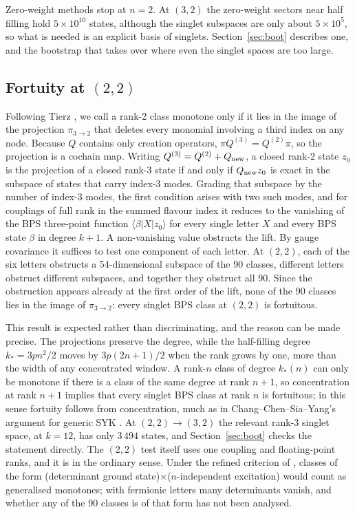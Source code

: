 \documentclass[10pt]{article}
\begin{document}
Zero-weight methods stop at $n=2$. At $(3,2)$ the zero-weight sectors near half filling hold $5\times10^{10}$
states, although the singlet subspaces are only about $5\times10^5$, so what is needed is an explicit basis of
singlets. Section~\ref{sec:boot} describes one, and the bootstrap that takes over where even the singlet spaces are
too large.

\subsection{\texorpdfstring{Fortuity at $(2,2)$}{Fortuity at (2,2)}}\label{sec:fortuity}

Following Tierz \cite{Tierz}, we call a rank-2 class monotone only if it lies in the image of the projection
$\pi_{3\to2}$ that deletes every monomial involving a third index on any node. Because $Q$ contains only creation
operators, $\pi Q^{(3)}=Q^{(2)}\pi$, so the projection is a cochain map. Writing $Q^{(3)}=Q^{(2)}+Q_{\rm new}$, a
closed rank-2 state $z_0$ is the projection of a closed rank-3 state if and only if $Q_{\rm new}z_0$ is exact in the
subspace of states that carry index-3 modes. Grading that subspace by the number of index-3 modes, the first
condition arises with two such modes, and for couplings of full rank in the summed flavour index it reduces to the
vanishing of the BPS three-point function $\langle\beta|X|z_0\rangle$ for every single letter $X$ and every BPS
state $\beta$ in degree $k+1$. A non-vanishing value obstructs the lift. By gauge covariance it suffices to test one
component of each letter. At $(2,2)$, each of the six letters obstructs a 54-dimensional subspace of the 90 classes,
different letters obstruct different subspaces, and together they obstruct all 90. Since the obstruction appears
already at the first order of the lift, none of the 90 classes lies in the image of $\pi_{3\to2}$: every singlet BPS
class at $(2,2)$ is fortuitous.

This result is expected rather than discriminating, and the reason can be made precise. The projections preserve
the degree, while the half-filling degree $k_*=3pn^2/2$ moves by $3p(2n+1)/2$ when the rank grows by one, more than
the width of any concentrated window. A rank-$n$ class of degree $k_*(n)$ can only be monotone if there is a class of
the same degree at rank $n+1$, so concentration at rank $n+1$ implies that every singlet BPS class at rank $n$ is
fortuitous; in this sense fortuity follows from concentration, much as in Chang--Chen--Sia--Yang's argument for
generic SYK \cite{CCSY}. At $(2,2)\to(3,2)$ the relevant rank-3 singlet space, at $k=12$, has only $3\,494$ states,
and Section~\ref{sec:boot} checks the statement directly. The $(2,2)$ test itself uses one coupling and floating-point ranks, and it
is in the ordinary sense. Under the refined criterion of \cite{CCK},
classes of the form (determinant ground state)$\times$($n$-independent excitation) would count as generalised
monotones; with fermionic letters many determinants vanish, and whether any of the 90 classes is of that form has
not been analysed.
\end{document}
